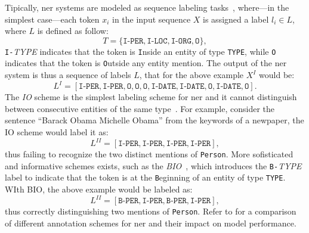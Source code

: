 Tipically, \ac{ner} systems are modeled as sequence labeling tasks~\cite{jm3,keraghel2024recentadvancesnamedentity,entityorientedsearch2018balog}, where---in the simplest case---each token $x_i$ in the input sequence $X$ is assigned a label $l_i \in L$, where $L$ is defined as follow:
\begin{equation}
    T = \{\texttt{I-PER}, \texttt{I-LOC}, \texttt{I-ORG}, \texttt{O}\},
\end{equation}
\texttt{I-}\textit{TYPE} indicates that the token is \texttt{I}nside an entity of type \texttt{TYPE}, while \texttt{O} indicates that the token is \texttt{O}utside any entity mention. The output of the \ac{ner} system is thus a sequence of labels $L$, that for the above example $X^I$ would be:
\begin{equation}
L^I = [\texttt{I-PER}, \texttt{I-PER}, \texttt{O}, \texttt{O}, \texttt{O}, \texttt{I-DATE}, \texttt{I-DATE}, \texttt{O}, \texttt{I-DATE}, \texttt{O}].
\end{equation}
The \emph{IO} scheme is the simplest labeling scheme for \ac{ner} and it cannot distinguish between consecutive entities of the same type~\cite{alshammari2021impact}. For example, consider the sentence ``Barack Obama Michelle Obama'' from the keywords of a newpaper, the IO scheme would label it as:
\begin{equation}
L^{II} = [\texttt{I-PER}, \texttt{I-PER}, \texttt{I-PER}, \texttt{I-PER}],
\end{equation}
thus failing to recognize the two distinct mentions of \texttt{Person}. More sofisticated and informative schemes exists, such as the \emph{BIO}~\cite{ramshaw-marcus-1995-text-bio-scheme}, which introduces the \texttt{B-}\textit{TYPE} label to indicate that the token is at the \texttt{B}eginning of an entity of type \texttt{TYPE}. WIth BIO, the above example would be labeled as:
\begin{equation}
L^{II} = [\texttt{B-PER}, \texttt{I-PER}, \texttt{B-PER}, \texttt{I-PER}],
\end{equation}
thus correctly distinguishing two mentions of \texttt{Person}.
Refer to \textcite{alshammari2021impact} for a comparison of different annotation schemes for \ac{ner} and their impact on model performance.

